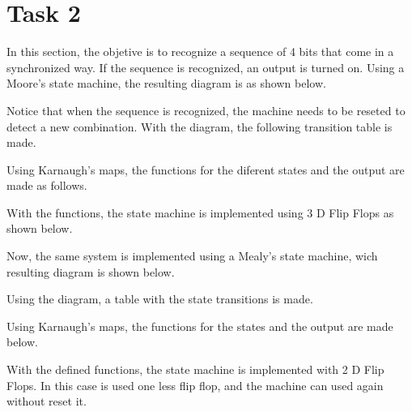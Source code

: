


\section*{Task 2}

In this section, the objetive is to recognize a 
sequence of 4 bits that come in a synchronized
way. If the sequence is recognized, an output 
is turned on. Using a Moore's state machine,
the resulting diagram is as shown below.


Notice that when the sequence is recognized, 
the machine needs to be reseted to detect a 
new combination. With the diagram, the following transition table 
is made.


Using Karnaugh's maps, the functions for
the diferent states and the output are made
as follows.


With the functions, the state machine is 
implemented using 3 D Flip Flops as shown below.


Now, the same system is implemented using a Mealy's 
state machine, wich resulting diagram is shown below.


Using the diagram, a table with the state 
transitions is made.


Using Karnaugh's maps, the functions for the 
states and the output are made below.


With the defined functions, the state machine 
is implemented with 2 D Flip Flops. In this case
is used one less flip flop, and the machine can
used again without reset it.


